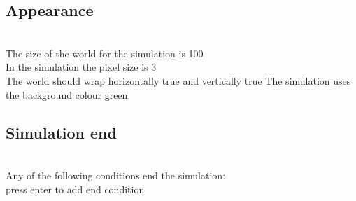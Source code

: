 \documentclass{article}
\begin{document}
\subsection{Appearance}\\                                            
The size of the world for the simulation is 100\\
In the simulation the pixel size is 3\\
The world should wrap horizontally true and vertically true   
The simulation uses the background colour green\\                   
\subsection{Simulation end}\\
Any of the following conditions end the simulation:\\
press enter to add end condition\\
\end{document}
